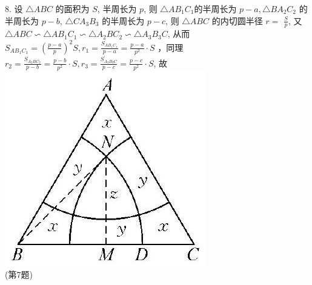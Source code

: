 \documentclass[10pt]{article}
\begin{document}
8. 设 $\triangle A B C$ 的面积为 $S$, 半周长为 $p$, 则 $\triangle A B_{1} C_{1}$的半周长为 $p-a, \triangle B A_{2} C_{2}$ 的半周长为 $p-b$, $\triangle C A_{3} B_{3}$ 的半周长为 $p-c$, 则 $\triangle A B C$ 的内切圆半径 $r=$ $\frac{S}{p}$, 又 $\triangle A B C \backsim \triangle A B_{1} C_{1} \backsim \triangle A_{2} B C_{2} \backsim \triangle A_{3} B_{3} C$, 从而 $S_{A B_{1} C_{1}}=\left(\frac{p-a}{p}\right)^{2} S, r_{1}=\frac{S_{A B_{1} C_{1}}}{p-a}=\frac{p-a}{p^{2}} \cdot S$ ，同理 $r_{2}=\frac{S_{A_{2} B C_{2}}}{p-b}=\frac{p-b}{p^{2}} \cdot S, r_{3}=\frac{S_{A_{3} B_{3} C}^{\prime}}{p-c}=\frac{p-c}{p^{2}} \cdot S$, 故\\
\includegraphics[max width=\textwidth, center]{2024_10_30_66b8e5e701da2093c133g-086}\\
(第7题)\\
\end{document}
